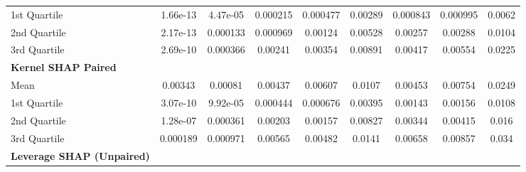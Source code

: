 {\begin{tabular} {lcccccccc}
\hspace{7pt}1st Quartile & \cellcolor{gold!60}1.66e-13 & \cellcolor{gold!60}4.47e-05 & \cellcolor{gold!60}0.000215 & \cellcolor{gold!60}0.000477 & \cellcolor{gold!60}0.00289 & \cellcolor{gold!60}0.000843 & \cellcolor{gold!60}0.000995 & \cellcolor{gold!60}0.0062 \\ 
\hspace{7pt}2nd Quartile & \cellcolor{silver!60}2.17e-13 & \cellcolor{gold!60}0.000133 & \cellcolor{gold!60}0.000969 & \cellcolor{gold!60}0.00124 & \cellcolor{gold!60}0.00528 & \cellcolor{gold!60}0.00257 & \cellcolor{gold!60}0.00288 & \cellcolor{gold!60}0.0104 \\ 
\hspace{7pt}3rd Quartile & \cellcolor{gold!60}2.69e-10 & \cellcolor{gold!60}0.000366 & \cellcolor{gold!60}0.00241 & \cellcolor{gold!60}0.00354 & \cellcolor{gold!60}0.00891 & \cellcolor{gold!60}0.00417 & \cellcolor{gold!60}0.00554 & \cellcolor{gold!60}0.0225 \\ 
\addlinespace[1ex] 
\textbf{Kernel SHAP Paired} &  &  &  &  &  &  &  &  \\ 
\hspace{7pt}Mean & \cellcolor{bronze!60}0.00343 & \cellcolor{silver!60}0.00081 & \cellcolor{silver!60}0.00437 & \cellcolor{silver!60}0.00607 & \cellcolor{silver!60}0.0107 & \cellcolor{silver!60}0.00453 & \cellcolor{silver!60}0.00754 & \cellcolor{bronze!60}0.0249 \\ 
\hspace{7pt}1st Quartile & \cellcolor{bronze!60}3.07e-10 & \cellcolor{silver!60}9.92e-05 & \cellcolor{silver!60}0.000444 & \cellcolor{silver!60}0.000676 & \cellcolor{silver!60}0.00395 & \cellcolor{bronze!60}0.00143 & 0.00156 & 0.0108 \\ 
\hspace{7pt}2nd Quartile & \cellcolor{bronze!60}1.28e-07 & \cellcolor{silver!60}0.000361 & \cellcolor{silver!60}0.00203 & \cellcolor{silver!60}0.00157 & \cellcolor{silver!60}0.00827 & \cellcolor{bronze!60}0.00344 & \cellcolor{bronze!60}0.00415 & \cellcolor{silver!60}0.016 \\ 
\hspace{7pt}3rd Quartile & \cellcolor{bronze!60}0.000189 & \cellcolor{silver!60}0.000971 & \cellcolor{silver!60}0.00565 & \cellcolor{silver!60}0.00482 & \cellcolor{silver!60}0.0141 & \cellcolor{silver!60}0.00658 & \cellcolor{bronze!60}0.00857 & \cellcolor{bronze!60}0.034 \\ 
\addlinespace[1ex] 
\textbf{Leverage SHAP (Unpaired)} &  &  &  &  &  &  &  &  \\ 

\end{tabular}}
